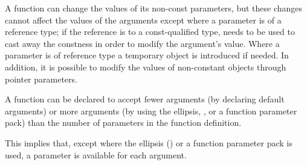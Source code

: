 \pnum
\begin{note}
%
%
%
%
%
%
A function can change the values of its non-const parameters, but these
changes cannot affect the values of the arguments except where a
parameter is of a reference type; if the reference is to
a const-qualified type,  needs to be used to
cast away the constness in order to modify the argument's value. Where a
parameter is of  reference type a temporary object is
introduced if
needed.
In addition, it is possible to modify the values of non-constant objects through
pointer parameters.
\end{note}

\pnum
{}%
%
A function can be declared to accept fewer arguments (by declaring default
arguments) or more arguments (by using the ellipsis,
, or a function parameter pack) than the number of
parameters in the function definition.
\begin{note}
This implies that, except where the ellipsis () or a function
parameter pack is used, a parameter is available for each argument.
\end{note}

